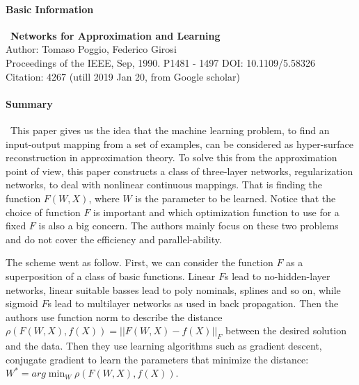 \documentclass{article}
\begin{document}
\thispagestyle{empty}

\paragraph{Basic Information} \ 
\textbf{Networks for Approximation and Learning}\\
Author: Tomaso Poggio, Federico Girosi\\
Proceedings of the IEEE, Sep, 1990. P1481 - 1497 DOI: 10.1109/5.58326\\
Citation: 4267 (utill 2019 Jan 20, from Google scholar)

\paragraph{Summary} \ 
This paper gives us the idea that the machine learning problem, to find an input-output mapping from a set of examples, can be considered as hyper-surface reconstruction in approximation theory. To solve this from the approximation point of view, this paper constructs a class of three-layer networks, regularization networks, to deal with nonlinear continuous mappings. That is finding the function $F(W, X)$, where $W$ is the parameter to be learned. Notice that the choice of function $F$ is important and which optimization function to use for a fixed $F$ is also a big concern. The authors mainly focus on these two problems and do not cover the efficiency and parallel-ability. 

The scheme went as follow. First, we can consider the function $F$ as a superposition of a class of basic functions. Linear $F$s lead to no-hidden-layer networks, linear suitable basses lead to poly nominals, splines and so on, while sigmoid $F$s lead to multilayer networks as used in back propagation. Then the authors use function norm to describe the distance $\rho(F(W,X), f(X)) = ||F(W,X)-f(X)||_{F}$ between the desired solution and the data. Then they use learning algorithms such as gradient descent, conjugate gradient to learn the parameters that minimize the distance: $W^* = arg\min_W{\rho(F(W,X), f(X)) }$.
\end{document}
